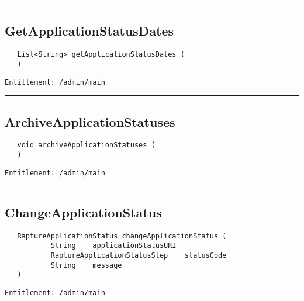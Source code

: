 \rule{12cm}{2pt}
\subsection{GetApplicationStatusDates}
\label{Api:GetApplicationStatusDates}
\begin{verbatim}
   List<String> getApplicationStatusDates (
   )
\end{verbatim}
\begin{Verbatim}[fontsize=\small, formatcom=\color{Maroon}]
  Entitlement: /admin/main
\end{Verbatim}



\rule{12cm}{2pt}
\subsection{ArchiveApplicationStatuses}
\label{Api:ArchiveApplicationStatuses}
\begin{verbatim}
   void archiveApplicationStatuses (
   )
\end{verbatim}
\begin{Verbatim}[fontsize=\small, formatcom=\color{Maroon}]
  Entitlement: /admin/main
\end{Verbatim}



\rule{12cm}{2pt}
\subsection{ChangeApplicationStatus}
\label{Api:ChangeApplicationStatus}
\begin{verbatim}
   RaptureApplicationStatus changeApplicationStatus (
           String    applicationStatusURI
           RaptureApplicationStatusStep    statusCode
           String    message
   )
\end{verbatim}
\begin{Verbatim}[fontsize=\small, formatcom=\color{Maroon}]
  Entitlement: /admin/main
\end{Verbatim}



